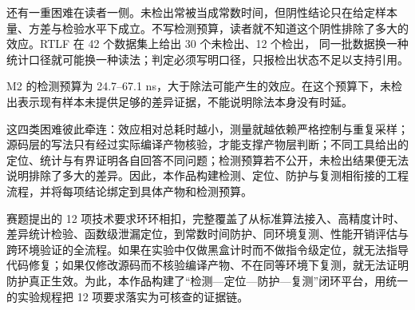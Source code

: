 还有一重困难在读者一侧。未检出常被当成常数时间，但阴性结论只在给定样本量、方差与检验水平下成立。不写检测预算，读者就不知道这个阴性排除了多大的效应。RTLF 在 42 个数据集上给出 30 个未检出、12 个检出\cite{rtlf}，%
同一批数据换一种统计口径就可能换一种读法；判定必须写明口径，只报检出状态不足以支持引用。

M2 的检测预算为 24.7--67.1 ns，大于除法可能产生的效应。在这个预算下，未检出表示现有样本未提供足够的差异证据，不能说明除法本身没有时延。%

这四类困难彼此牵连：效应相对总耗时越小，测量就越依赖严格控制与重复采样；源码层的写法只有经过实际编译产物核验，才能支撑产物层判断；不同工具给出的定位、统计与有界证明各自回答不同问题；检测预算若不公开，未检出结果便无法说明排除了多大的差异。因此，本作品构建检测、定位、防护与复测相衔接的工程流程，并将每项结论绑定到具体产物和检测预算。

赛题提出的 12 项技术要求环环相扣，完整覆盖了从标准算法接入、高精度计时、差异统计检验、函数级泄漏定位，到常数时间防护、同环境复测、性能开销评估与跨环境验证的全流程。如果在实验中仅做黑盒计时而不做指令级定位，就无法指导代码修复；如果仅修改源码而不核验编译产物、不在同等环境下复测，就无法证明防护真正生效。为此，本作品构建了“检测—定位—防护—复测”闭环平台，用统一的实验规程把 12 项要求落实为可核查的证据链。

\begin{center}
\end{center}

